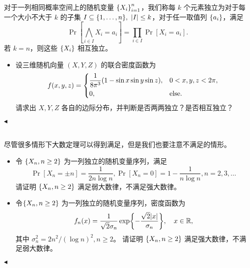 \documentclass[11pt]{article}
\newenvironment{question}[2][Question]{\begin{trivlist}
\item[\hskip \labelsep {\bfseries #1}\hskip \labelsep {\bfseries #2.}]}{\hfill$\blacktriangleleft$\end{trivlist}}
\begin{document}
\begin{question}{2 (30') (独立性)}
    对于一列相同概率空间上的随机变量 $\qty{X_i}_{i=1}^n$，我们称每 $k$ 个元素独立为对于每一个大小不大于 $k$ 的子集 $I \subseteq \qty{1, \ldots, n},\ \abs{I} \leq k$，对于任一取值列 $\qty{a_i}$，满足
    \[ \Pr[\bigwedge_{i \in I} X_i = a_i] = \prod_{i \in I} \Pr[X_i = a_i]. \]
    若 $k=n$，则这些 $\qty{X_i}$ 相互独立。
    \begin{itemize}
        \item[f (5')] 设三维随机向量 $(X, Y, Z)$ 的联合密度函数为
        \begin{equation*}
            f(x, y, z) = \begin{dcases}
                \frac{1}{8\pi^3}\qty(1 - \sin{x}\sin{y}\sin{z}), & 0 < x, y, z < 2\pi, \\
                0, & \mathrm{else}.
            \end{dcases}
        \end{equation*}
        请求出 $X, Y, Z$ 各自的边际分布，并判断是否两两独立？是否相互独立？
    \end{itemize}
    \end{question}

    \begin{question}{3 (10') (大数定律)}~\\
    尽管很多情形下大数定理可以得到满足，但是我们也要注意不满足的情形。
    \begin{itemize}
        \item [a (5')] 令 $\qty{X_n, n \geq 2}$ 为一列独立的随机变量序列，满足
        \[ \Pr[X_n = \pm n] = \frac{1}{2n\log n}, \Pr[X_n = 0] = 1 - \frac{1}{n \log n}, n = 2, 3, \ldots \]
        请证明 $\qty{X_n, n \geq 2}$ 满足弱大数律，不满足强大数律。
        \item [b (5')] 令$\qty{X_n, n \geq 2}$ 为一列独立的随机变量序列，密度函数为
        \[ f_n(x) = \frac{1}{\sqrt{2} \sigma_n} \exp{-\frac{\sqrt{2}\abs{x}}{\sigma_n}}, \quad x \in \mathbb{R}, \]
        其中 $\sigma_n^2 = 2n^2 / (\log n)^2, n \geq 2$。
        请证明 $\qty{X_n, n \geq 2}$ 满足强大数律，不满足弱大数律。
    \end{itemize}
        
    \end{question}
\end{document}

